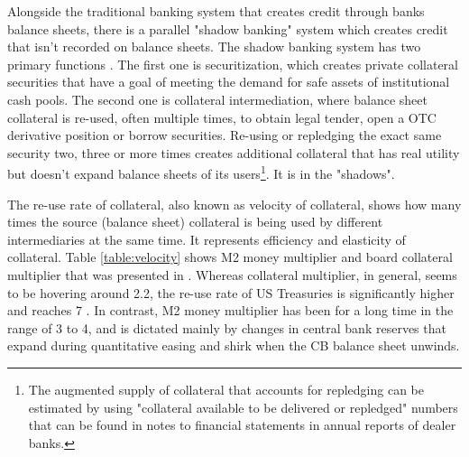 \documentclass[11pt,a4paper,english,oneside]{article}
\begin{document}
Alongside the traditional banking system that creates credit through banks balance sheets, there is a parallel "shadow banking" system which creates credit that isn't recorded on balance sheets. The shadow banking system has two primary functions \citep{claessens2012}. The first one is securitization, which creates private collateral securities that have a goal of meeting the demand for safe assets of institutional cash pools. The second one is collateral intermediation, where balance sheet collateral is re-used, often multiple times, to obtain legal tender, open a OTC derivative position or borrow securities. Re-using or repledging the exact same security two, three or more times creates additional collateral that has real utility but doesn't expand balance sheets of its users\footnote{The augmented supply of collateral that accounts for repledging can be estimated by using "collateral available to be delivered or repledged" numbers that can be found in notes to financial statements in annual reports of dealer banks.}. It is in the "shadows".

The re-use rate of collateral, also known as velocity of collateral, shows how many times the source (balance sheet) collateral is being used by different intermediaries at the same time. It represents efficiency and elasticity of collateral. Table \ref{table:velocity} shows M2 money multiplier and board collateral multiplier that was presented in \citet{aitken2010}. Whereas collateral multiplier, in general, seems to be hovering around 2.2, the re-use rate of US Treasuries is significantly higher and reaches 7 \citep{infante2020}. In contrast, M2 money multiplier has been for a long time in the range of 3 to 4, and is dictated mainly by changes in central bank reserves that expand during quantitative easing and shirk when the CB balance sheet unwinds.
\end{document}
